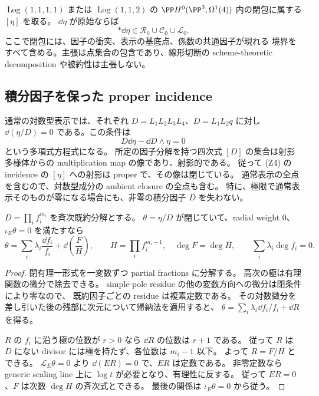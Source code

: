 \begin{theorem}[二つの対数型成分の全閉包]
\label{thm:all-log-boundaries}
$\operatorname{Log}(1,1,1,1)$ または $\operatorname{Log}(1,1,2)$ の
$\PP H^0(\PP^3,\Omega^1(4))$ 内の閉包に属する $[\eta]$ を取る。
$\dd\eta$ が原始ならば
\[
 *\dd\eta\in\mathcal R_0\cup\mathcal C_0\cup\mathcal L_0.
 \tag{Z3}\label{eq:log-containment}
\]
ここで閉包には、因子の衝突、表示の基底点、係数の共通因子が現れる
境界をすべて含める。主張は点集合の包含であり、線形切断の
scheme-theoretic decomposition や被約性は主張しない。
\end{theorem}

\subsection{積分因子を保った proper incidence}

通常の対数型表示では、それぞれ $D=L_1L_2L_3L_4$、$D=L_1L_2q$ に対し
$\dd(\eta/D)=0$ である。この条件は
\[
 D\dd\eta-\dd D\wedge\eta=0                                  \tag{Z4}
\]
という多項式方程式になる。
所定の因子分解を持つ四次式 $[D]$ の集合は射影多様体からの
multiplication map の像であり、射影的である。
従って (Z4) の incidence の $[\eta]$ への射影は proper で、その像は閉じている。
通常表示の全点を含むので、対数型成分の ambient closure の全点も含む。
特に、極限で通常表示そのものが零になる場合にも、非零の積分因子 $D$ を失わない。

\begin{lemma}[閉有理一形式の極の次数]
\label{lem:closed-rational-poles}
$D=\prod_i f_i^{m_i}$ を斉次既約分解とする。
$\theta=\eta/D$ が閉じていて、radial weight $0$、$\iota_E\theta=0$ を満たすなら
\[
 \theta=\sum_i\lambda_i\frac{\dd f_i}{f_i}+\dd\!\left(\frac{F}{H}\right),
 \qquad H=\prod_i f_i^{m_i-1},\quad \deg F=\deg H,
 \qquad \sum_i\lambda_i\deg f_i=0.                            \tag{Z5}
\]
\end{lemma}
\begin{proof}
閉有理一形式を一変数ずつ partial fractions に分解する。
高次の極は有理関数の微分で除去できる。
simple-pole residue の他の変数方向への微分は閉条件により零なので、
既約因子ごとの residue は複素定数である。
その対数微分を差し引いた後の残部に次元について帰納法を適用すると、
$\theta=\sum_i\lambda_i\dd f_i/f_i+\dd R$ を得る。

$R$ の $f_i$ に沿う極の位数が $r>0$ なら $\dd R$ の位数は $r+1$ である。
従って $R$ は $D$ にない divisor には極を持たず、各位数は $m_i-1$ 以下。
よって $R=F/H$ とできる。
$\mathcal L_E\theta=0$ より $\dd(ER)=0$ で、$ER$ は定数である。
非零定数なら generic scaling line 上に $\log t$ が必要となり、有理性に反する。
従って $ER=0$、$F$ は次数 $\deg H$ の斉次式とできる。
最後の関係は $\iota_E\theta=0$ から従う。
\end{proof}

